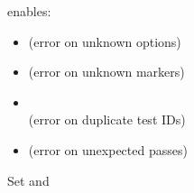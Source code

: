 \vspace{-1.5em}
\pytestix{}\hspace{1em}  enables: \vspace{-.5em}

\begin{itemize}[itemsep=0pt]
    \item {} (error on unknown options)
    \item {} (error on unknown markers)
    \item {} \\ (error on duplicate test IDs)
    \item {} (error on unexpected passes)
\end{itemize}

\pytestix[<9]\hspace{1em} Set  and \\[.25em] 


